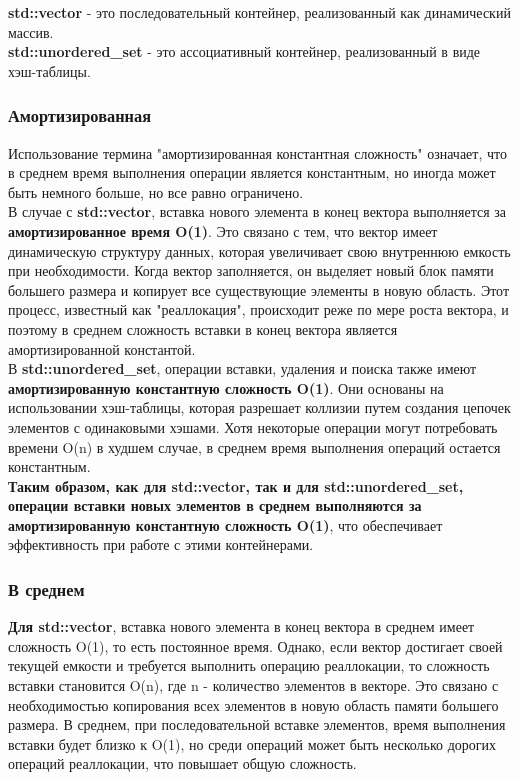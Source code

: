     \textbf{std::vector} - это последовательный контейнер, реализованный как динамический массив.\\

    \textbf{std::unordered\_set} - это ассоциативный контейнер, реализованный в виде хэш-таблицы.
    
        \subsubsection{Амортизированная}
            Использование термина "амортизированная константная сложность" означает, что в среднем время выполнения операции является константным, но иногда может быть немного больше, но все равно ограничено.\\

            В случае с \textbf{std::vector}, вставка нового элемента в конец вектора выполняется за \textbf{амортизированное время O(1)}. Это связано с тем, что вектор имеет динамическую структуру данных, которая увеличивает свою внутреннюю емкость при необходимости. Когда вектор заполняется, он выделяет новый блок памяти большего размера и копирует все существующие элементы в новую область. Этот процесс, известный как "реаллокация", происходит реже по мере роста вектора, и поэтому в среднем сложность вставки в конец вектора является амортизированной константой.\\
            
            В\textbf{ std::unordered\_set}, операции вставки, удаления и поиска также имеют \textbf{амортизированную константную сложность O(1)}. Они основаны на использовании хэш-таблицы, которая разрешает коллизии путем создания цепочек элементов с одинаковыми хэшами. Хотя некоторые операции могут потребовать времени O(n) в худшем случае, в среднем время выполнения операций остается константным.\\
            
            \textbf{Таким образом, как для std::vector, так и для std::unordered\_set, операции вставки новых элементов в среднем выполняются за амортизированную константную сложность O(1)}, что обеспечивает эффективность при работе с этими контейнерами.
        \subsubsection{В среднем}
            \textbf{Для std::vector}, вставка нового элемента в конец вектора в среднем имеет сложность O(1), то есть постоянное время. Однако, если вектор достигает своей текущей емкости и требуется выполнить операцию реаллокации, то сложность вставки становится O(n), где n - количество элементов в векторе. Это связано с необходимостью копирования всех элементов в новую область памяти большего размера. В среднем, при последовательной вставке элементов, время выполнения вставки будет близко к O(1), но среди операций может быть несколько дорогих операций реаллокации, что повышает общую сложность.\\

